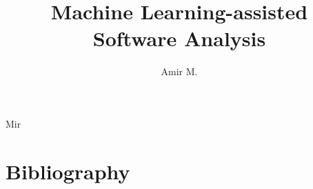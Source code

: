 \documentclass{dissertation}
\begin{document}
\title{Machine Learning-assisted Software Analysis}

\author{Amir M.}{Mir}

\frontmatter

\setcounter{page}{0}


\dedication{\centering \textit{I dedicate my PhD thesis to my mother who unexpectedly passed away at the end of my PhD journey.}}

\tableofcontents




\mainmatter

\thumbtrue











%

\thumbfalse

\chapter*{Bibliography}










\end{document}
